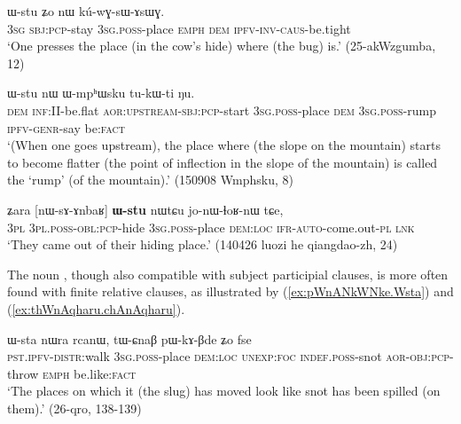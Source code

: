 \begin{exe}
\ex \label{ex:kWrAZi.Wstu}
  ɯ-stu ʑo nɯ kú-wɣ-sɯ-ɤsɯɣ. \\
\textsc{3sg} \textsc{sbj}:\textsc{pcp}-stay \textsc{3sg}.\textsc{poss}-place \textsc{emph} \textsc{dem} \textsc{ipfv}-\textsc{inv}-\textsc{caus}-be.tight \\
\glt `One presses the place (in the cow's hide) where (the bug) is.' (25-akWzgumba, 12)
\end{exe}

\begin{exe}
\ex \label{ex:tAntAm.lAkWZa.Wstu}
  ɯ-stu nɯ ɯ-mpʰɯsku tu-kɯ-ti ŋu. \\
\textsc{dem} \textsc{inf}:II-be.flat \textsc{aor}:\textsc{upstream}-\textsc{sbj}:\textsc{pcp}-start \textsc{3sg}.\textsc{poss}-place \textsc{dem} \textsc{3sg}.\textsc{poss}-rump \textsc{ipfv}-\textsc{genr}-say be:\textsc{fact} \\
\glt  `(When one goes upstream), the place where (the slope on the mountain) starts to become flatter (the point of inflection in the slope of the mountain) is called  the `rump' (of the mountain).' (150908 Wmphsku, 8)
\end{exe}
 
\begin{exe}
\ex \label{ex:nWsAnbaR.Wstu}
 \gll ʑara [nɯ-sɤ-ɤnbaʁ] \textbf{ɯ-stu} nɯtɕu jo-nɯ-ɬoʁ-nɯ tɕe, \\
 \textsc{3pl} \textsc{3pl}.\textsc{poss}-\textsc{obl}:\textsc{pcp}-hide \textsc{3sg}.\textsc{poss}-place \textsc{dem}:\textsc{loc} \textsc{ifr}-\textsc{auto}-come.out-\textsc{pl} \textsc{lnk} \\
 \glt `They came out of their hiding place.' (140426 luozi he qiangdao-zh, 24)
\end{exe}

The noun , though also compatible with subject participial clauses, is more often found with finite relative clauses, as illustrated by  (\ref{ex:pWnANkWNke.Wsta}) and (\ref{ex:thWnAqharu.chAnAqharu}).  

\begin{exe}
\ex \label{ex:pWnANkWNke.Wsta}
 \gll  [pɯ-nɤŋkɯŋke] ɯ-sta nɯra rcanɯ, tɯ-ɕnaβ pɯ-kɤ-βde ʑo fse \\
 \textsc{pst}.\textsc{ipfv}-\textsc{distr}:walk \textsc{3sg}.\textsc{poss}-place \textsc{dem}:\textsc{loc} \textsc{unexp}:\textsc{foc} \textsc{indef}.\textsc{poss}-snot \textsc{aor}-\textsc{obj}:\textsc{pcp}-throw \textsc{emph} be.like:\textsc{fact} \\
 \glt `The places on which it (the slug) has moved look like snot has been spilled (on them).' (26-qro, 138-139)
 \end{exe}


